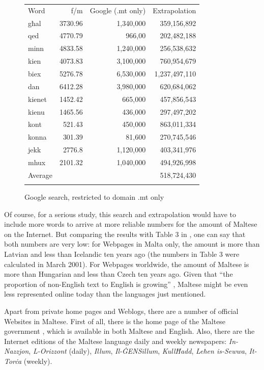 \begin{multicols}{2}
\begin{figure}[tb]
\setlength{\tabcolsep}{2.9em}
\begin{tabularx}{\textwidth}{lrrr} \toprule\addlinespace
Word & f/m & Google (.mt only) & Extrapolation \\ \addlinespace\midrule\addlinespace
għal & 3730.96 & 1,340,000 & 359,156,892 \\
qed	& 4770.79 & 966,00  &  202,482,188  \\
minn & 4833.58 & 1,240,000  &  256,538,632 \\
kien & 4073.83 & 3,100,000  &  760,954,679 \\
biex & 5276.78 & 6,530,000  & 1,237,497,110 \\
dan	& 6412.28  & 3,980,000  & 620,684,062  \\
kienet & 1452.42  & 665,000 &  457,856,543 \\
kienu & 1465.56  & 436,000  & 297,497,202  \\
kont & 521.43  & 450,000  &  863,011,334 \\
konna & 301.39  & 81,600  &   270,745,546\\
jekk & 2776.8  &  1,120,000 & 403,341,976 \\
mhux & 2101.32  & 1,040,000  &  494,926,998 \\ \addlinespace\midrule\addlinespace
Average& & & 518,724,430 \\ \addlinespace\bottomrule
\end{tabularx}
\caption{Google search, restricted to domain .mt only}
\label{table:Google_B_en}
\end{figure}

Of course, for a serious study, this search and extrapolation would have to include more words to arrive at more reliable numbers for the amount of Maltese on the Internet. But comparing the results with Table 3 in \cite{Kilgarriff-Grefenstette:2003}, one can say that both numbers are very low: for Webpages in Malta only, the amount is more than Latvian and less than Icelandic ten years ago (the numbers in Table 3 were calculated in March 2001). For Webpages worldwide, the amount of Maltese is more than Hungarian and less than Czech ten years ago. Given that ``the proportion of non-English text to English is growing'' \cite{Kilgarriff-Grefenstette:2003}, Maltese might be even less represented online today than the languages just mentioned.

Apart from private home pages and Weblogs, there are a number of official Websites in Maltese. First of all, there is the home page of the Maltese government \cite{GovernmentOfMalta1}, which is available in both Maltese and English. Also, there are the Internet editions of the Maltese language daily and weekly newspapers: \emph{In-Nazzjon}, \emph{L-Orizzont} (daily), \emph{Illum}, \emph{Il-ĠENSillum}, \emph{KullĦadd}, \emph{Leħen is-Sewwa}, \emph{It-Torċa} (weekly).  


\end{multicols}
